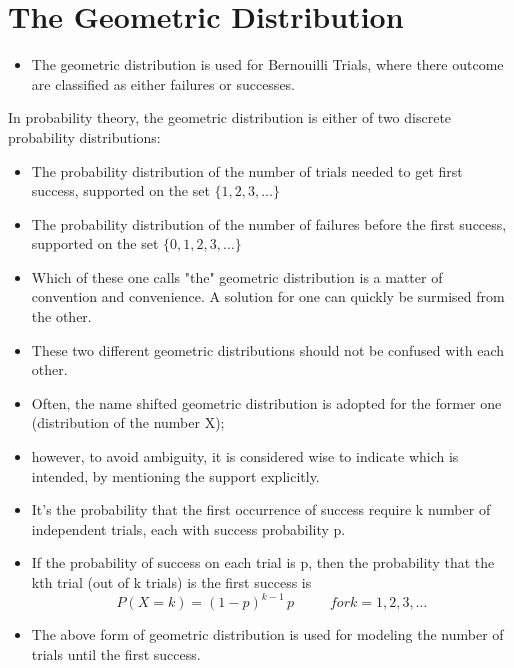 \documentclass[]{report}
\begin{document}


\section{The Geometric Distribution }


\begin{itemize}
\item The geometric distribution is used for Bernouilli Trials, where there outcome are classified as either failures or successes.
\end{itemize} \bigskip

In probability theory, the geometric distribution is either of two discrete probability distributions:
\begin{itemize}
\item The probability distribution of the number of trials needed to get first success, supported on the set $\{ 1, 2, 3, \ldots\}$
\item The probability distribution of the number of failures before the first success, supported on the set $\{ 0, 1, 2, 3, \ldots\}$

\item Which of these one calls "the" geometric distribution is a matter of convention and convenience. A solution for one can quickly be surmised from the other.
\item These two different geometric distributions should not be confused with each other. 
\item Often, the name shifted geometric distribution is adopted for the former one (distribution of the number X); 
\item however, to avoid ambiguity, it is considered wise to indicate which is intended, by mentioning the support explicitly.

\item It’s the probability that the first occurrence of success require k number of independent trials, each with success probability p. 

\item If the probability of success on each trial is p, then the probability that the kth trial (out of k trials) is the first success is
\[  P(X = k) = (1-p)^{k-1}\,p\, \phantom{space} for k = 1, 2, 3, \ldots \]


\item The above form of geometric distribution is used for modeling the number of trials until the first success. 


\end{itemize}
\end{document}
